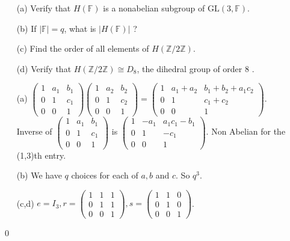 \begin{itemize}
	\item[(a)] Verify that $H(\mathbb{F})$ is a nonabelian subgroup of $\mathrm{GL}(3, \mathbb{F})$.
	\item[(b)] If $|\mathbb{F}|=q$, what is $|H(\mathbb{F})|$ ?
	\item[(c)] Find the order of all elements of $H(\mathbb{Z} / 2 \mathbb{Z})$.
	\item[(d)] Verify that $H(\mathbb{Z} / 2 \mathbb{Z}) \cong D_{8}$, the dihedral group of order 8 .
\end{itemize}
\soln
\begin{itemize}
	\item[(a)] $ \begin{pmatrix}
		1 & a_1 & b_1\\
		0 & 1 & c_1\\
		0 & 0 & 1
	\end{pmatrix} 
\begin{pmatrix}
	1 & a_2 & b_2\\
	0 & 1 & c_2\\
	0 & 0 & 1
\end{pmatrix} = 
\begin{pmatrix}
	1 & a_1+a_2 & b_1+b_2 +a_1c_2\\
	0 & 1 & c_1+c_2\\
	0 & 0 & 1
\end{pmatrix}$.\\
Inverse of $ \begin{pmatrix}
	1 & a_1 & b_1\\
	0 & 1 & c_1\\
	0 & 0 & 1
\end{pmatrix} $ is $ \begin{pmatrix}
1 & -a_1 & a_1c_1-b_1\\
0 & 1 & -c_1\\
0 & 0 & 1
\end{pmatrix} $. Non Abelian for the (1,3)th entry.
\item[(b)] We have $ q $ choices for each of $ a,b $ and $ c $. So $ q^3 $.
\item[(c,d)] $ e=I_3 , r= \begin{pmatrix}
	1 & 1 & 1\\
	0 & 1 & 1\\
	0 & 0 & 1
\end{pmatrix}, s= \begin{pmatrix}
1 & 1 & 0\\
0 & 1 & 0\\
0 & 0 & 1
\end{pmatrix}$.
\end{itemize}
\qed\\

